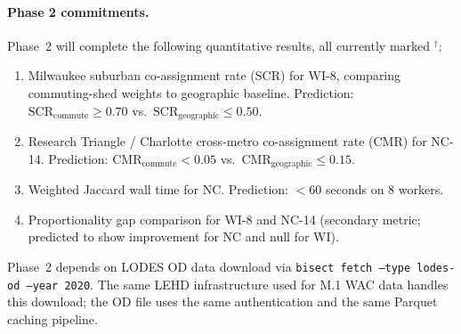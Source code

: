 \paragraph{Phase 2 commitments.}
Phase~2 will complete the following quantitative results, all currently
marked ${}^{\dagger}$:
\begin{enumerate}
  \item Milwaukee suburban co-assignment rate (SCR) for WI-8,
    comparing commuting-shed weights to geographic baseline.
    Prediction: $\mathrm{SCR}_{\mathrm{commute}} \geq 0.70$ vs.\
    $\mathrm{SCR}_{\mathrm{geographic}} \leq 0.50$.
  \item Research Triangle / Charlotte cross-metro co-assignment rate (CMR)
    for NC-14.
    Prediction: $\mathrm{CMR}_{\mathrm{commute}} < 0.05$ vs.\
    $\mathrm{CMR}_{\mathrm{geographic}} \leq 0.15$.
  \item Weighted Jaccard wall time for NC.
    Prediction: $< 60$ seconds on 8 workers.
  \item Proportionality gap comparison for WI-8 and NC-14 (secondary metric;
    predicted to show improvement for NC and null for WI).
\end{enumerate}

Phase~2 depends on LODES OD data download via
\texttt{bisect fetch --type lodes-od --year 2020}.
The same LEHD infrastructure used for M.1 WAC data handles this download;
the OD file uses the same authentication and the same Parquet caching
pipeline.
